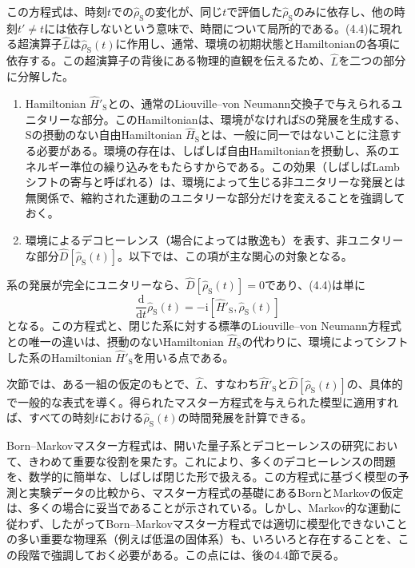 \hypertarget{srcpage:155}{}\label{srcpage:155}
この方程式は、時刻$t$での$\hat\rho_{\mathrm S}$の変化が、同じ$t$で評価した$\hat\rho_{\mathrm S}$のみに依存し、他の時刻$t'\ne t$には依存しないという意味で、時間について局所的である。(4.4)に現れる超演算子$\hat L$は$\hat\rho_{\mathrm S}(t)$に作用し、通常、環境の初期状態とHamiltonianの各項に依存する。この超演算子の背後にある物理的直観を伝えるため、$\hat L$を二つの部分に分解した。
\begin{enumerate}
\item Hamiltonian $\hat H'_{\mathrm S}$との、通常のLiouville--von Neumann交換子で与えられるユニタリーな部分。このHamiltonianは、環境がなければSの発展を生成する、Sの摂動のない自由Hamiltonian $\hat H_{\mathrm S}$とは、一般に同一ではないことに注意する必要がある。環境の存在は、しばしば自由Hamiltonianを摂動し、系のエネルギー準位の繰り込みをもたらすからである。この効果（しばしばLambシフトの寄与と呼ばれる）は、環境によって生じる非ユニタリーな発展とは無関係で、縮約された運動のユニタリーな部分だけを変えることを強調しておく。
\item 環境によるデコヒーレンス（場合によっては散逸も）を表す、非ユニタリーな部分$\hat D[\hat\rho_{\mathrm S}(t)]$。以下では、この項が主な関心の対象となる。
\end{enumerate}
系の発展が完全にユニタリーなら、$\hat D[\hat\rho_{\mathrm S}(t)]=0$であり、(4.4)は単に
\begin{equation}
\frac{\mathrm d}{\mathrm dt}\hat\rho_{\mathrm S}(t)=-\mathrm i[\hat H'_{\mathrm S},\hat\rho_{\mathrm S}(t)]
\tag{4.5}
\end{equation}
となる。この方程式と、閉じた系に対する標準のLiouville--von Neumann方程式との唯一の違いは、摂動のないHamiltonian $\hat H_{\mathrm S}$の代わりに、環境によってシフトした系のHamiltonian $\hat H'_{\mathrm S}$を用いる点である。

次節では、ある一組の仮定のもとで、$\hat L$、すなわち$\hat H'_{\mathrm S}$と$\hat D[\hat\rho_{\mathrm S}(t)]$の、具体的で一般的な表式を導く。得られたマスター方程式を与えられた模型に適用すれば、すべての時刻$t$における$\hat\rho_{\mathrm S}(t)$の時間発展を計算できる。

Born--Markovマスター方程式は、開いた量子系とデコヒーレンスの研究において、きわめて重要な役割を果たす。これにより、多くのデコヒーレンスの問題を、数学的に簡単な、しばしば閉じた形で扱える。この方程式に基づく模型の予測と実験データの比較から、マスター方程式の基礎にあるBornとMarkovの仮定は、多くの場合に妥当であることが示されている。しかし、Markov的な運動に従わず、したがってBorn--Markovマスター方程式では適切に模型化できないことの多い重要な物理系（例えば低温の固体系）も、いろいろと存在することを、この段階で強調しておく必要がある。この点には、後の4.4節で戻る。

